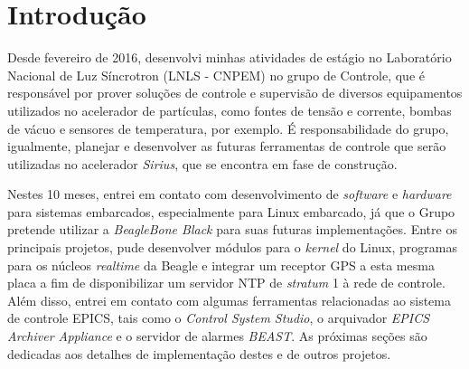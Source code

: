 \section {Introdução}

Desde fevereiro de 2016, desenvolvi minhas atividades de
estágio no Laboratório Nacional de Luz Síncrotron (LNLS - CNPEM) no grupo de
Controle, que é responsável por prover soluções de controle e supervisão de diversos
equipamentos utilizados no acelerador de partículas, como fontes de tensão e
corrente, bombas de vácuo e sensores de temperatura, por exemplo. É
responsabilidade do grupo, igualmente, planejar e desenvolver as futuras
ferramentas de controle que serão utilizadas no acelerador \textit{Sirius}, que
se encontra em fase de construção.

\vspace{12pt}

Nestes 10 meses, entrei em contato com desenvolvimento
de \textit{software} e \textit{hardware} para sistemas embarcados, especialmente
para Linux embarcado, já que o Grupo pretende utilizar a
\textit{BeagleBone Black} para suas futuras
implementações. Entre os principais projetos, pude desenvolver módulos para o
\textit{kernel} do Linux, programas para os núcleos \textit{realtime} da Beagle
e integrar um receptor GPS a esta mesma placa a fim de disponibilizar um servidor NTP de \textit{stratum} 1 à
rede de controle. Além disso, entrei em contato com algumas ferramentas
relacionadas ao sistema de controle EPICS, tais como o
\textit{Control System Studio}, o arquivador \textit{EPICS Archiver Appliance}
e o servidor de alarmes \textit{BEAST}. As próximas seções são dedicadas aos
detalhes de implementação destes e de outros projetos.

\newpage
